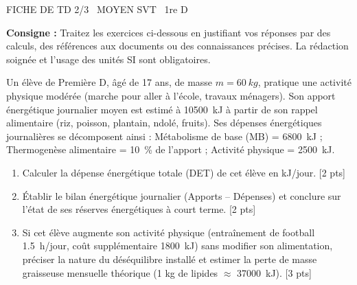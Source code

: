\documentclass[11pt]{article}
\begin{document}
\begin{tcolorbox}[enhanced,colback=popink,colframe=popink,arc=10pt,boxrule=0pt,left=12pt,right=12pt,top=9pt,bottom=9pt]
{\color{white}\popxbold\small FICHE DE TD 2/3 \textbullet\ MOYEN \hfill SVT \textbullet\ 1re D\par}
\end{tcolorbox}
\vspace{4pt}
\noindent \textbf{Consigne :} Traitez les exercices ci-dessous en justifiant vos réponses par des calculs, des références aux documents ou des connaissances précises. La rédaction soignée et l'usage des unités SI sont obligatoires.

\begin{exercice}
Un élève de Première D, âgé de 17 ans, de masse $m = \SI{60}{kg}$, pratique une activité physique modérée (marche pour aller à l'école, travaux ménagers). Son apport énergétique journalier moyen est estimé à \SI{10500}{kJ} à partir de son rappel alimentaire (riz, poisson, plantain, ndolé, fruits). Ses dépenses énergétiques journalières se décomposent ainsi : Métabolisme de base (MB) = \SI{6800}{kJ} ; Thermogenèse alimentaire = \SI{10}{\percent} de l'apport ; Activité physique = \SI{2500}{kJ}.
\begin{enumerate}
    \item Calculer la dépense énergétique totale (DET) de cet élève en kJ/jour. [2 pts]
    \item Établir le bilan énergétique journalier (Apports -- Dépenses) et conclure sur l'état de ses réserves énergétiques à court terme. [2 pts]
    \item Si cet élève augmente son activité physique (entraînement de football \SI{1.5}{h}/jour, coût supplémentaire \SI{1800}{kJ}) sans modifier son alimentation, préciser la nature du déséquilibre installé et estimer la perte de masse graisseuse mensuelle théorique (1 kg de lipides $\approx$ \SI{37000}{kJ}). [3 pts]
\end{enumerate}
\end{exercice}
\end{document}
